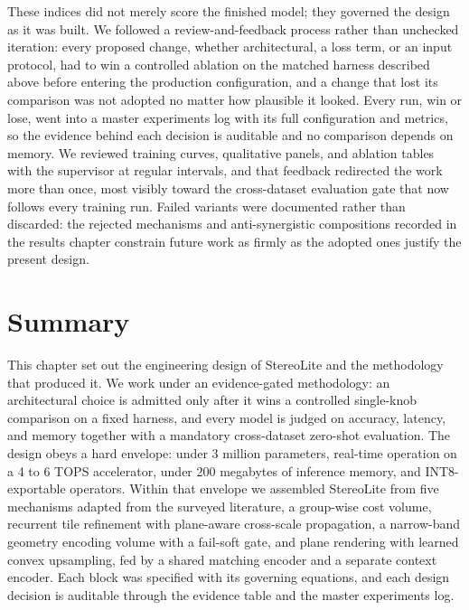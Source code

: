 These indices did not merely score the finished model; they governed the
design as it was built. We followed a review-and-feedback process rather
than unchecked iteration: every proposed change, whether architectural, a
loss term, or an input protocol, had to win a controlled ablation on the
matched harness described above before entering the production
configuration, and a change that lost its comparison was not adopted no
matter how plausible it looked. Every run, win or lose, went into a master
experiments log with its full configuration and metrics, so the evidence
behind each decision is auditable and no comparison depends on memory. We
reviewed training curves, qualitative panels, and ablation tables with the
supervisor at regular intervals, and that feedback redirected the work
more than once, most visibly toward the cross-dataset evaluation gate that
now follows every training run. Failed variants were documented rather
than discarded: the rejected mechanisms and anti-synergistic compositions
recorded in the results chapter constrain future work as firmly as the
adopted ones justify the present design.

\FloatBarrier
\section{Summary}
This chapter set out the engineering design of StereoLite and the
methodology that produced it. We work under an evidence-gated
methodology: an architectural choice is admitted only after it wins a
controlled single-knob comparison on a fixed harness, and every model is
judged on accuracy, latency, and memory together with a mandatory
cross-dataset zero-shot evaluation. The design obeys a hard envelope:
under 3 million parameters, real-time operation on a 4 to 6 TOPS
accelerator, under 200 megabytes of inference memory, and
INT8-exportable operators. Within that envelope we assembled StereoLite
from five mechanisms adapted from the surveyed literature, a group-wise
cost volume, recurrent tile refinement with plane-aware cross-scale
propagation, a narrow-band geometry encoding volume with a fail-soft
gate, and plane rendering with learned convex upsampling, fed by a shared
matching encoder and a separate context encoder. Each block was specified
with its governing equations, and each design decision is auditable
through the evidence table and the master experiments log.


